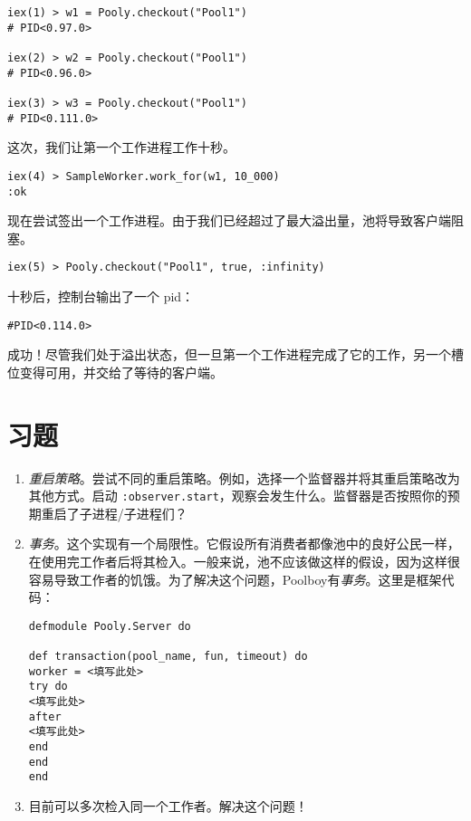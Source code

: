 \begin{code}{}
\begin{verbatim}
iex(1) > w1 = Pooly.checkout("Pool1")
# PID<0.97.0>

iex(2) > w2 = Pooly.checkout("Pool1")
# PID<0.96.0>

iex(3) > w3 = Pooly.checkout("Pool1")
# PID<0.111.0>
\end{verbatim}
\end{code}

这次，我们让第一个工作进程工作十秒。

\begin{code}{}
\begin{verbatim}
iex(4) > SampleWorker.work_for(w1, 10_000)
:ok
\end{verbatim}
\end{code}

现在尝试签出一个工作进程。由于我们已经超过了最大溢出量，池将导致客户端阻塞。

\begin{code}{}
\begin{verbatim}
iex(5) > Pooly.checkout("Pool1", true, :infinity)
\end{verbatim}
\end{code}

十秒后，控制台输出了一个 pid：

\texttt{\#PID<0.114.0>}

成功！尽管我们处于溢出状态，但一旦第一个工作进程完成了它的工作，另一个槽位变得可用，并交给了等待的客户端。

 \section{习题}

\begin{enumerate}
\def\labelenumi{\arabic{enumi}.}
\item  \emph{重启策略}。尝试不同的重启策略。例如，选择一个监督器并将其重启策略改为其他方式。启动
  \texttt{:observer.start}，观察会发生什么。监督器是否按照你的预期重启了子进程/子进程们？
\item  \emph{事务}。这个实现有一个局限性。它假设所有消费者都像池中的良好公民一样，在使用完工作者后将其检入。一般来说，池不应该做这样的假设，因为这样很容易导致工作者的饥饿。为了解决这个问题，Poolboy有\emph{事务}。这里是框架代码：

\begin{code}{}
\begin{verbatim}
defmodule Pooly.Server do

def transaction(pool_name, fun, timeout) do
worker = <填写此处>
try do
<填写此处>
after
<填写此处>
end
end
end
\end{verbatim}
\end{code}
\item  目前可以多次检入同一个工作者。解决这个问题！
\end{enumerate}

